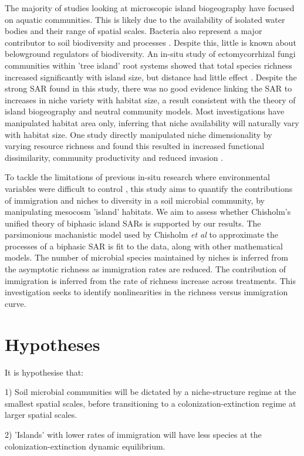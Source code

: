 \indent The majority of studies looking at microscopic island biogeography have focused on aquatic communities. This is likely due to the availability of isolated water bodies and their range of spatial scales. Bacteria also represent a major contributor to soil biodiversity and processes \cite{griffiths2011bacterial}. Despite this, little is known about belowground regulators of biodiversity. An in-situ study of ectomycorrhizal fungi communities within 'tree island' root systems showed that total species richness increased significantly with island size, but distance had little effect \cite{peay2007strong}. Despite the strong SAR found in this study, there was no good evidence linking the SAR to increases in niche variety with habitat size, a result consistent with the theory of island biogeography and neutral community models. Most investigations have manipulated habitat area only, inferring that niche availability will naturally vary with habitat size. One study directly manipulated niche dimensionality by varying resource richness and found this resulted in increased functional dissimilarity, community productivity and reduced invasion \cite{eisenhauer2013niche}. \

\indent To tackle the limitations of previous in-situ research where environmental variables were difficult to control \cite{fenchel2005bacteria}, this study aims to quantify the contributions of immigration and niches to diversity in a soil microbial community, by manipulating mesocosm 'island' habitats. We aim to assess whether Chisholm's unified theory of biphasic island SARs is supported by our results. The parsimonious machanistic model used by Chisholm \textit{et al} \cite{chisholm2016maintenance} to approximate the processes of a biphasic SAR is fit to the data, along with other mathematical models. The number of microbial species maintained by niches is inferred from the asymptotic richness as immigration rates are reduced. The contribution of immigration is inferred from the rate of richness increase across treatments. This investigation seeks to identify nonlinearities in the richness versus immigration curve. \

\section{Hypotheses}

\indent It is hypothesise that: \ 

1) Soil microbial communities will be dictated by a niche-structure regime at the smallest spatial scales, before transitioning to a colonization-extinction regime at larger spatial scales. \

2) 'Islands' with lower rates of immigration will have less species at the colonization-extinction dynamic equilibrium. \
